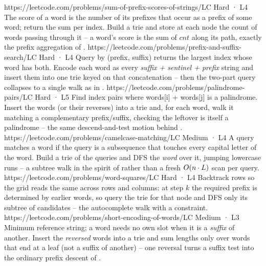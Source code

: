 \begin{mixedset}
    {https://leetcode.com/problems/sum-of-prefix-scores-of-strings/}{LC Hard · L4}
    {The score of a word is the number of its prefixes that occur as a prefix of some word; return the sum
    per index. Build a trie and store at each node the count of words passing through it -- a word's score
    is the sum of $\mathit{cnt}$ along its path, exactly the prefix aggregation of .}
    {https://leetcode.com/problems/prefix-and-suffix-search/}{LC Hard · L4}
    {Query by (prefix, suffix) returns the largest index whose word has both. Encode each word as every
    \emph{suffix + sentinel + prefix} string and insert them into one trie keyed on that concatenation --
    then the two-part query collapses to a single  walk as in .}
    {https://leetcode.com/problems/palindrome-pairs/}{LC Hard · L5}
    {Find index pairs where words[i] + words[j] is a palindrome. Insert the words (or their reverses) into a
    trie and, for each word, walk it matching a complementary prefix/suffix, checking the leftover is itself
    a palindrome -- the same descend-and-test motion behind .}
    {https://leetcode.com/problems/camelcase-matching/}{LC Medium · L4}
    {A query matches a word if the query is a subsequence that touches every capital letter of the word.
    Build a trie of the queries and DFS the \emph{word} over it, jumping lowercase runs -- a subtree walk in
    the spirit of  rather than a fresh $O(n\cdot L)$ scan per query.}
    {https://leetcode.com/problems/word-squares/}{LC Hard · L4}
    {Backtrack rows so the grid reads the same across rows and columns: at step $k$ the required prefix is
    determined by earlier words, so query the trie for that  node and DFS only its subtree
    of candidates -- the autocomplete walk  with a constraint.}
    {https://leetcode.com/problems/short-encoding-of-words/}{LC Medium · L3}
    {Minimum reference string; a word needs no own slot when it is a \emph{suffix} of another. Insert the
    \emph{reversed} words into a trie and sum lengths only over words that end at a leaf (not a suffix of
    another) -- one reversal turns a suffix test into the ordinary prefix descent of .}

\end{mixedset}
